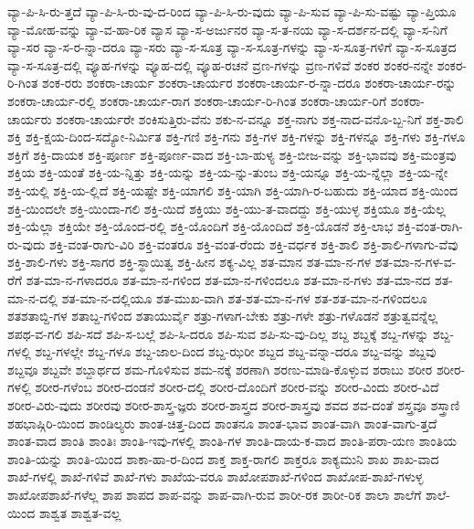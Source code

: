 {ವ್ಯಾ-ಪಿ-ಸಿ-ರು-ತ್ತದೆ
ವ್ಯಾ-ಪಿ-ಸಿ-ರು-ವು-ದ-ರಿಂದ
ವ್ಯಾ-ಪಿ-ಸಿ-ರು-ವುದು
ವ್ಯಾ-ಪಿ-ಸುವ
ವ್ಯಾ-ಪಿ-ಸು-ವಷ್ಟು
ವ್ಯಾ-ಪ್ತಿಯೂ
ವ್ಯಾ-ಮೋಹ-ವನ್ನು
ವ್ಯಾ-ವ-ಹಾ-ರಿಕ
ವ್ಯಾಸ
ವ್ಯಾ-ಸ-ಅರ್ಜುನರ
ವ್ಯಾ-ಸ-ತ-ನಯ
ವ್ಯಾ-ಸ-ದರ್ಶನ-ದಲ್ಲಿ
ವ್ಯಾ-ಸ-ನಿಗೆ
ವ್ಯಾ-ಸರ
ವ್ಯಾ-ಸ-ರ-ನ್ನಾ-ದರೂ
ವ್ಯಾ-ಸರು
ವ್ಯಾ-ಸ-ಸೂತ್ರ
ವ್ಯಾ-ಸ-ಸೂತ್ರ-ಗಳನ್ನು
ವ್ಯಾ-ಸ-ಸೂತ್ರ-ಗಳಿಗೆ
ವ್ಯಾ-ಸ-ಸೂತ್ರದ
ವ್ಯಾ-ಸ-ಸೂತ್ರ-ದಲ್ಲಿ
ವ್ಯೂಹ-ಗಳನ್ನು
ವ್ಯೂಹ-ದಲ್ಲಿ
ವ್ಯೂಹ-ರಚನೆ
ವ್ರಣ-ಗಳನ್ನು
ವ್ರಣ-ಗಳಿವೆ
ಶಂಕರ
ಶಂಕರ-ನನ್ನೇ
ಶಂಕರ-ರಿ-ಗಿಂತ
ಶಂಕ-ರರು
ಶಂಕರಾ-ಚಾರ್ಯ
ಶಂಕರಾ-ಚಾರ್ಯರ
ಶಂಕರಾ-ಚಾರ್ಯ-ರ-ನ್ನಾ-ದರೂ
ಶಂಕರಾ-ಚಾರ್ಯ-ರನ್ನು
ಶಂಕರಾ-ಚಾರ್ಯ-ರಲ್ಲಿ
ಶಂಕರಾ-ಚಾರ್ಯ-ರಾಗ
ಶಂಕರಾ-ಚಾರ್ಯ-ರಿ-ಗಿಂತ
ಶಂಕರಾ-ಚಾರ್ಯ-ರಿಗೆ
ಶಂಕರಾ-ಚಾರ್ಯರು
ಶಂಕರಾ-ಚಾರ್ಯರೇ
ಶಂಕಿಸುತ್ತಿರು-ವೆನು
ಶಕು-ನ-ವನ್ನೂ
ಶಕ್ತ-ನಾಗು
ಶಕ್ತ-ನಾದ-ವನೊ-ಬ್ಬ-ನಿಗೆ
ಶಕ್ತ-ಶಾಲಿ
ಶಕ್ತಿ
ಶಕ್ತಿ-ಕ್ಷಯ-ದಿಂದ-ಸದ್ಯೋ-ನಿರ್ಮಿತ
ಶಕ್ತಿ-ಗಣಿ
ಶಕ್ತಿ-ಗನು
ಶಕ್ತಿ-ಗಳ
ಶಕ್ತಿ-ಗಳನ್ನು
ಶಕ್ತಿ-ಗಳನ್ನೂ
ಶಕ್ತಿ-ಗಳು
ಶಕ್ತಿ-ಗಳೂ
ಶಕ್ತಿಗೆ
ಶಕ್ತಿ-ದಾಯಕ
ಶಕ್ತಿ-ಪೂರ್ಣ
ಶಕ್ತಿ-ಪೂರ್ಣ-ವಾದ
ಶಕ್ತಿ-ಬಾ-ಹುಳ್ಯ
ಶಕ್ತಿ-ಬೀಜ-ವನ್ನು
ಶಕ್ತಿ-ಭಾವವು
ಶಕ್ತಿ-ಮಂತ್ರವು
ಶಕ್ತಿಯ
ಶಕ್ತಿ-ಯಂತೆ
ಶಕ್ತಿ-ಯ-ನ್ನಿತ್ತು
ಶಕ್ತಿ-ಯನ್ನು
ಶಕ್ತಿ-ಯ-ನ್ನು-ತುಂಬ
ಶಕ್ತಿ-ಯನ್ನೂ
ಶಕ್ತಿ-ಯ-ನ್ನೆಲ್ಲಾ
ಶಕ್ತಿ-ಯ-ನ್ನೇ
ಶಕ್ತಿ-ಯಲ್ಲಿ
ಶಕ್ತಿ-ಯ-ಲ್ಲಿದೆ
ಶಕ್ತಿ-ಯಷ್ಟೇ
ಶಕ್ತಿ-ಯಾಗಲಿ
ಶಕ್ತಿ-ಯಾಗಿ
ಶಕ್ತಿ-ಯಾಗಿ-ರ-ಬಹುದು
ಶಕ್ತಿ-ಯಾದ
ಶಕ್ತಿ-ಯಿಂದ
ಶಕ್ತಿ-ಯಿಂದಲೇ
ಶಕ್ತಿ-ಯಿಂದಾ-ಗಲಿ
ಶಕ್ತಿ-ಯಿದೆ
ಶಕ್ತಿಯು
ಶಕ್ತಿ-ಯು-ತ-ವಾದದ್ದು
ಶಕ್ತಿ-ಯುಳ್ಳ
ಶಕ್ತಿಯೂ
ಶಕ್ತಿ-ಯೆಲ್ಲ
ಶಕ್ತಿ-ಯೆಲ್ಲಾ
ಶಕ್ತಿಯೇ
ಶಕ್ತಿ-ಯೊಂದ-ರಲ್ಲಿ
ಶಕ್ತಿ-ಯೊಂದಿಗೆ
ಶಕ್ತಿ-ಯೊಂದಿದೆ
ಶಕ್ತಿ-ಯೊಡನೆ
ಶಕ್ತಿ-ಲಾಭ
ಶಕ್ತಿ-ವಂತ-ರಾಗಿ-ರು-ವುದು
ಶಕ್ತಿ-ವಂತ-ರಾಗು-ವಿರಿ
ಶಕ್ತಿ-ವಂತರೂ
ಶಕ್ತಿ-ವಂತ-ರೆಂದು
ಶಕ್ತಿ-ವರ್ಧಕ
ಶಕ್ತಿ-ಶಾಲಿ
ಶಕ್ತಿ-ಶಾಲಿ-ಗಳಾಗು-ವೆವು
ಶಕ್ತಿ-ಶಾಲಿ-ಗಳು
ಶಕ್ತಿ-ಸಾಗರ
ಶಕ್ತಿ-ಸ್ಥಾಯಿತ್ವ
ಶಕ್ತಿ-ಹೀನ
ಶಕ್ಯ-ವಿಲ್ಲ
ಶತ-ಮಾನ
ಶತ-ಮಾ-ನ-ಗಳ
ಶತ-ಮಾ-ನ-ಗಳ-ವ-ರೆಗೆ
ಶತ-ಮಾ-ನ-ಗಳಾದರೂ
ಶತ-ಮಾ-ನ-ಗಳಿಂದ
ಶತ-ಮಾ-ನ-ಗಳಿಂದಲೂ
ಶತ-ಮಾ-ನ-ಗಳು
ಶತ-ಮಾ-ನದ
ಶತ-ಮಾ-ನ-ದಲ್ಲಿ
ಶತ-ಮಾ-ನ-ದಲ್ಲಿಯೂ
ಶತ-ಮುಖ-ವಾಗಿ
ಶತ-ಶತ-ಮಾ-ನ-ಗಳ
ಶತ-ಶತ-ಮಾ-ನ-ಗಳಿಂದಲೂ
ಶತಶತಾಬ್ದಿ-ಗಳ
ಶತಾಬ್ದ-ಗಳಿಂದ
ಶತಾಯುರ್ವೈ
ಶತ್ರು-ಗಳಾಗ-ಬೇಕು
ಶತ್ರು-ಗಳೇ
ಶತ್ರು-ಗಳೊಡನೆ
ಶತ್ರುತ್ವವನ್ನೆಲ್ಲ
ಶಪಥ-ವ-ಗಲಿ
ಶಪಿ-ಸದೆ
ಶಪಿ-ಸ-ಬಲ್ಲೆ
ಶಪಿ-ಸಿ-ದರೂ
ಶಪಿ-ಸುವ
ಶಪಿ-ಸು-ವು-ದಿಲ್ಲ
ಶಬ್ದ
ಶಬ್ದಕ್ಕೆ
ಶಬ್ದ-ಗಳನ್ನು
ಶಬ್ದ-ಗಳಲ್ಲಿ
ಶಬ್ದ-ಗಳಲ್ಲೇ
ಶಬ್ದ-ಗಳೂ
ಶಬ್ದ-ಜಾಲ-ದಿಂದ
ಶಬ್ದ-ಝರೀ
ಶಬ್ದದ
ಶಬ್ದ-ವನ್ನಾ-ದರೂ
ಶಬ್ದ-ವನ್ನು
ಶಬ್ದವು
ಶಬ್ದವೂ
ಶಬ್ದವೇ
ಶಬ್ದಾರ್ಥದ
ಶಮ-ಗೊಳಿಸುವ
ಶಮ-ನಕ್ಕೆ
ಶರಣಾಗಿ
ಶರಣು-ಮಾಡಿ-ಕೊಳ್ಳುವ
ಶರಾಬು
ಶರೀರ
ಶರೀರ-ಗಳಲ್ಲಿ
ಶರೀರ-ಗಳೆಂಬ
ಶರೀರ-ದಂಡನೆ
ಶರೀರ-ದಲ್ಲಿ
ಶರೀರ-ದೊಂದಿಗೆ
ಶರೀರ-ವನ್ನು
ಶರೀರ-ವಿಂದು
ಶರೀರ-ವಿದೆ
ಶರೀರ-ವಿರು-ವುದು
ಶರೀರವು
ಶರೀರ-ಶಾಸ್ತ್ರ-ಜ್ಞರು
ಶರೀರ-ಶಾಸ್ತ್ರದ
ಶರೀರ-ಶಾಸ್ತ್ರವು
ಶವದ
ಶವ-ದಂತೆ
ಶಸ್ತ್ರವೂ
ಶಸ್ತ್ರಾಣಿ
ಶಹಭಾಷ್ಗಿರಿ-ಯಿಂದ
ಶಾಂಡಿಲ್ಯರು
ಶಾಂತ-ಚಿತ್ತ-ದಿಂದ
ಶಾಂತನೂ
ಶಾಂತ-ಭಾವ
ಶಾಂತ-ವಾಗಿ
ಶಾಂತ-ವಾಗು-ತ್ತದೆ
ಶಾಂತ-ವಾದ
ಶಾಂತಿ
ಶಾಂತಿಃ
ಶಾಂತಿ-ಇವು-ಗಳಲ್ಲಿ
ಶಾಂತಿ-ಗಳ
ಶಾಂತಿ-ದಾಯ-ಕ-ವಾದ
ಶಾಂತಿ-ಪರಾ-ಯಣ
ಶಾಂತಿಯ
ಶಾಂತಿ-ಯನ್ನು
ಶಾಂತಿ-ಯಿಂದ
ಶಾಕಾ-ಹಾ-ರ-ದಿಂದ
ಶಾಕ್ತ
ಶಾಕ್ತ-ರಾಗಲಿ
ಶಾಕ್ತರೂ
ಶಾಕ್ಯಮುನಿ
ಶಾಖ
ಶಾಖ-ವಾದ
ಶಾಖೆ-ಗಳಲ್ಲಿ
ಶಾಖೆ-ಗಳಿವೆ
ಶಾಖೆ-ಗಳು
ಶಾಖೆಯ-ವರೂ
ಶಾಖೋಪಶಾಖೆ-ಗಳಿಂದ
ಶಾಖೋಪ-ಶಾಖೆ-ಗಳುಳ್ಳ
ಶಾಖೋಪಶಾಖೆ-ಗಳೆಲ್ಲ
ಶಾಪ
ಶಾಪದ
ಶಾಪ-ವನ್ನು
ಶಾಪ-ವಾಗಿ-ರುವ
ಶಾರೀ-ರಕ
ಶಾರೀ-ರಿಕ
ಶಾಲಾ
ಶಾಲೆಗೆ
ಶಾಲೆ-ಯಿಂದ
ಶಾಶ್ವತ
ಶಾಶ್ವತ-ವಲ್ಲ
}

